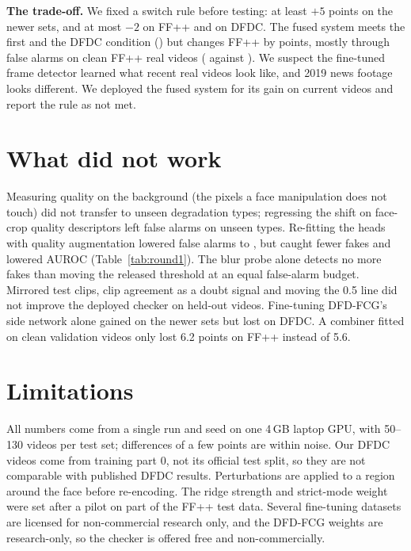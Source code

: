 \documentclass[11pt]{article}
\begin{document}
\textbf{The trade-off.} We fixed a switch rule before testing: at least $+5$ points on the newer sets, and at most $-2$
on FF++ and on DFDC. The fused system meets the first and the DFDC condition (\DfdcChange{}) but changes FF++ by \FfppChange{}
points, mostly through false alarms on clean FF++ real videos (\FfppCleanFAFin{} against \FfppCleanFABase{}).
We suspect the fine-tuned frame detector learned what recent real videos look like, and 2019 news footage looks different. We deployed the fused
system for its gain on current videos and report the rule as not met.

\begin{table}[t]
  \centering\small
  \caption{Held-out test sets, balanced accuracy at 0.5. $^\dagger$Fakes only: share caught. $^\ast$Research protocol,
  mean over as uploaded, strong blur and heavy H.264; FaceShifter is paired with the FF++ test reals. Newer sets: the
  live layout (8 clips, up to two faces). SC = self-calibration, ft = fine-tuned on 2025--2026 data.}
  \label{tab:fusion}
  \TabFusion
\end{table}

\section{What did not work}
\label{sec:negative}
Measuring quality on the background (the pixels a face manipulation does not touch) did not transfer to unseen
degradation types; regressing the shift on face-crop quality descriptors left \QsFA{} false alarms on unseen types.
Re-fitting the heads with quality augmentation lowered false alarms to \RefitFA{}, but caught fewer fakes and lowered AUROC (Table~\ref{tab:round1}). The blur
probe alone detects no more fakes than moving the released threshold at an equal false-alarm budget. Mirrored test
clips, clip agreement as a doubt signal and moving the 0.5 line did not improve the deployed checker on held-out
videos. Fine-tuning DFD-FCG's side network alone gained on the newer sets but lost on DFDC. A combiner fitted on clean validation videos only lost 6.2 points on FF++ instead of 5.6.

\section{Limitations}
All numbers come from a single run and seed on one 4\,GB laptop GPU, with 50--130 videos per test set; differences of a
few points are within noise. Our DFDC videos come from training part 0, not its official test split, so they are not
comparable with published DFDC results. Perturbations are applied to a region around the face before re-encoding.
The ridge strength and strict-mode weight were set after a pilot on part of the FF++ test data. Several fine-tuning
datasets are licensed for non-commercial research only, and the DFD-FCG weights are research-only, so the checker is
offered free and non-commercially.
\end{document}
